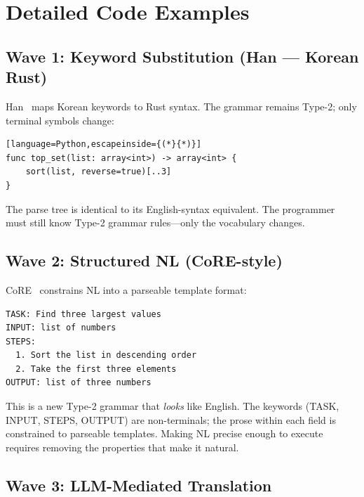 \documentclass{article}
\theoremstyle{definition}
\begin{document}

\appendix

\section{Detailed Code Examples}\label{app:code}

\subsection{Wave 1: Keyword Substitution (Han --- Korean Rust)}

Han~\citep{han2025} maps Korean keywords to Rust syntax. The grammar remains Type-2; only terminal symbols change:

\begin{lstlisting}[language=Python,escapeinside={(*}{*)}]
func top_set(list: array<int>) -> array<int> {
    sort(list, reverse=true)[..3]
}
\end{lstlisting}

The parse tree is identical to its English-syntax equivalent. The programmer must still know Type-2 grammar rules---only the vocabulary changes.

\subsection{Wave 2: Structured NL (CoRE-style)}

CoRE~\citep{core2025} constrains NL into a parseable template format:

\begin{lstlisting}
TASK: Find three largest values
INPUT: list of numbers
STEPS:
  1. Sort the list in descending order
  2. Take the first three elements
OUTPUT: list of three numbers
\end{lstlisting}

This is a new Type-2 grammar that \emph{looks} like English. The keywords (TASK, INPUT, STEPS, OUTPUT) are non-terminals; the prose within each field is constrained to parseable templates. Making NL precise enough to execute requires removing the properties that make it natural.

\subsection{Wave 3: LLM-Mediated Translation}
\end{document}
